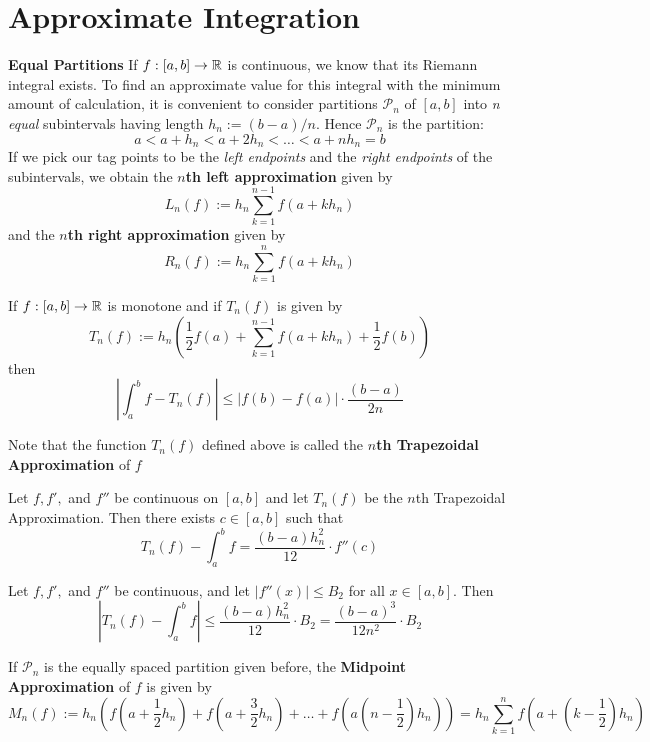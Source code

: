 \section{Approximate Integration}

\textbf{Equal Partitions}
If $f:[a,b] \to \mathbb{R}$ is continuous, we know that its Riemann integral exists. To find an approximate value for this integral with the minimum amount of calculation, it is convenient to consider partitions $\mathcal{P}_n$ of $[a,b]$ into \textit{n equal} subintervals having length $h_n:=(b-a)/n$. Hence $\mathcal{P}_n$ is the partition:
\[a<a+h_n<a+2h_n<\dots<a+nh_n=b\]
If we pick our tag points to be the \textit{left endpoints} and the \textit{right endpoints} of the subintervals, we obtain the \textbf{$n$th left approximation} given by
\[L_n(f):=h_n\sum\limits_{k=1}^{n-1}f(a+kh_n)\]
and the \textbf{$n$th right approximation} given by
\[R_n(f):=h_n\sum\limits_{k=1}^{n}f(a+kh_n)\]

\begin{theorem}
	If $f:[a,b] \to \mathbb{R}$ is monotone and if $T_n(f)$ is given by
	\[T_n(f):=h_n\left(\frac{1}{2}f(a)+\sum\limits_{k=1}^{n-1}f(a+kh_n)+\frac{1}{2}f(b)\right)\]
	then
	\[\left|\displaystyle\int_{a}^{b}f-T_n(f)\right|\leq |f(b)-f(a)|\cdot \frac{(b-a)}{2n}\]
\end{theorem}

Note that the function $T_n(f)$ defined above is called the \textbf{$n$th Trapezoidal Approximation} of $f$

\begin{theorem}
	Let $f,f',$ and $f''$ be continuous on $[a,b]$ and let $T_n(f)$ be the $n$th Trapezoidal Approximation. Then there exists $c \in [a,b]$ such that
	\[T_n(f)-\displaystyle\int_{a}^{b}f=\frac{(b-a)h^2_n}{12}\cdot f''(c)\]
\end{theorem}

\begin{corollary}
	Let $f,f',$ and $f''$ be continuous, and let $|f''(x)|\leq B_2$ for all $x \in [a,b]$. Then
	\[\left|T_n(f)-\displaystyle\int_{a}^{b}f\right|\leq \frac{(b-a)h_n^2}{12} \cdot B_2 = \frac{(b-a)^3}{12n^2}\cdot B_2\]
\end{corollary}

If $\mathcal{P}_n$ is the equally spaced partition given before, the \textbf{Midpoint Approximation} of $f$ is given by
\[M_n(f):=h_n\left(f\left(a+\frac{1}{2}h_n\right)+f\left(a+\frac{3}{2}h_n\right)+\dots+f\left(a\left(n-\frac{1}{2}\right)h_n\right)\right)=h_n\sum\limits_{k=1}^{n}f\left(a+\left(k-\frac{1}{2}\right)h_n\right)\]

